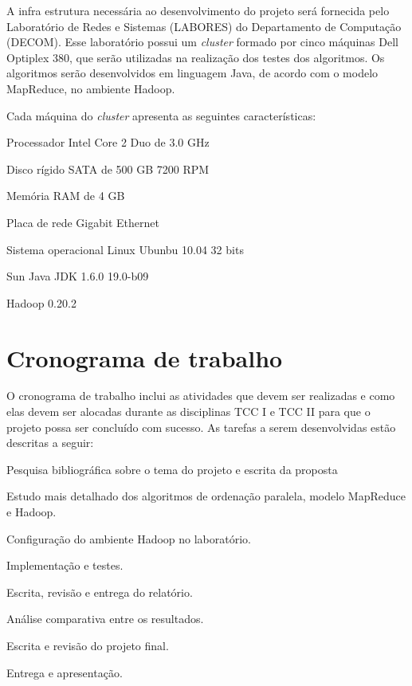 A infra estrutura necessária ao desenvolvimento do projeto será fornecida pelo Laboratório de Redes e Sistemas (LABORES) do Departamento de Computação (DECOM). Esse laboratório possui um \textit{cluster} formado por cinco máquinas Dell Optiplex 380, que serão utilizadas na realização dos testes dos algoritmos. Os algoritmos serão desenvolvidos em linguagem Java, de acordo com o modelo MapReduce, no ambiente Hadoop. 

Cada máquina do \textit{cluster} apresenta as seguintes características:
\begin{packed_enum}
\item Processador Intel Core 2 Duo de 3.0 GHz
\item Disco rígido SATA de 500 GB 7200 RPM
\item Memória RAM de 4 GB
\item Placa de rede Gigabit Ethernet
\item Sistema operacional Linux Ubunbu 10.04 32 bits %
\item Sun Java JDK 1.6.0 19.0-b09 
\item Hadoop 0.20.2
\end{packed_enum}

\chapter{Cronograma de trabalho}


O cronograma de trabalho inclui as atividades que devem ser realizadas e como elas devem ser alocadas durante as disciplinas TCC I e TCC II para que o projeto possa ser concluído com sucesso.
As tarefas a serem desenvolvidas estão descritas a seguir:

\begin{num_enum}
 \item \label{c1} Pesquisa bibliográfica sobre o tema do projeto e escrita da proposta
 \item \label{c2} Estudo mais detalhado dos algoritmos de ordenação paralela,  modelo MapReduce e Hadoop.
 \item \label{c3} Configuração do ambiente Hadoop no laboratório.
 \item \label{c4} Implementação e testes.
 \item \label{c5} Escrita, revisão e entrega do relatório. 
 \item \label{c7} Análise comparativa entre os resultados.
 \item \label{c8} Escrita e revisão do projeto final.
 \item \label{c9} Entrega e apresentação.
 \end{num_enum}
 
